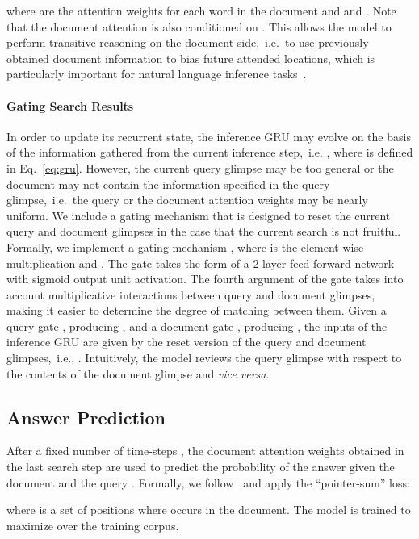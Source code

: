 \documentclass[11pt]{article}
\begin{document}
where  are the attention weights for each word in the document and  and .
Note that the document attention is also conditioned on . This allows the model to perform transitive reasoning on the document side,~i.e.~to use previously obtained document information to bias future attended locations, which is particularly important for natural language inference tasks~\cite{sukhbaatar2015end}.

\paragraph{Gating Search Results} In order to update its recurrent state, the inference GRU may evolve on the basis of the information gathered from the current inference step,~i.e. , where  is defined in Eq.~\ref{eq:gru}. However, the current query glimpse may be too general or the document may not contain the information specified in the query glimpse,~i.e.~the query or the document attention weights may be nearly uniform. We include a gating mechanism that is designed to reset the current query and document glimpses in the case that the current search is not fruitful. Formally, we implement a gating mechanism , where  is the element-wise multiplication and . The gate  takes the form of a 2-layer feed-forward network with sigmoid output unit activation. The fourth argument of the gate takes into account multiplicative interactions between query and document glimpses, making it easier to determine the degree of matching between them. Given a query gate , producing , and a document gate , producing , the inputs of the inference GRU are given by the reset version of the query and document glimpses,~i.e., . Intuitively, the model reviews the query glimpse with respect to the contents of the document glimpse and {\it vice versa}.

\subsection{Answer Prediction}
After a fixed number of time-steps , the document attention weights obtained in the last search step  are used to predict the probability of the answer given the document and the query . Formally, we follow~\cite{watson} and apply the ``pointer-sum'' loss:

where  is a set of positions where  occurs in the document. The model is trained to maximize  over the training corpus.

 
\end{document}
